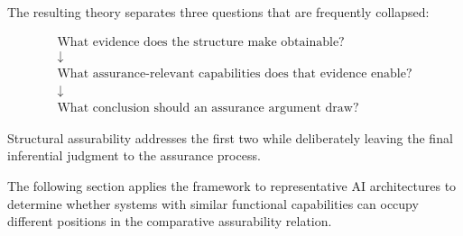 The resulting theory separates three questions that are frequently collapsed:

\begin{equation}
  \boxed{
    \begin{array}{c}
      \text{What evidence does the structure make obtainable?}
      \\[4pt]
      \downarrow
      \\[4pt]
      \text{What assurance-relevant capabilities does that evidence enable?}
      \\[4pt]
      \downarrow
      \\[4pt]
      \text{What conclusion should an assurance argument draw?}
    \end{array}
  }
\end{equation}

Structural assurability addresses the first two while deliberately leaving the final inferential judgment to the assurance process.

The following section applies the framework to representative AI architectures to determine
whether systems with similar functional capabilities can occupy different positions in the comparative assurability relation.
